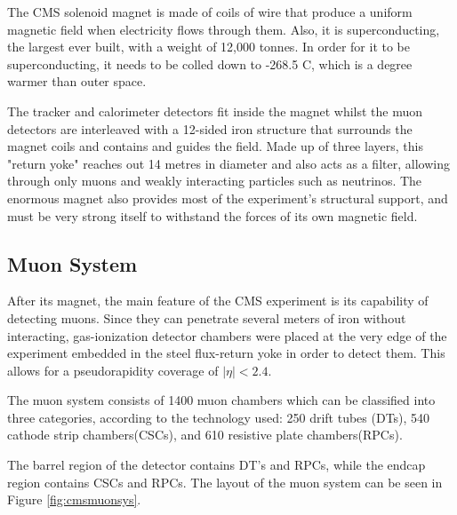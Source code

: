  The CMS solenoid magnet is made of coils of wire that produce a uniform magnetic field when electricity flows through them. Also, it is superconducting, the largest ever built, with a weight of 12,000 tonnes. In order for it to be superconducting, it needs to be colled down to -268.5 C, which is a degree warmer than outer space.

 The tracker and calorimeter detectors fit inside the magnet whilst the muon detectors are interleaved with a 12-sided iron structure that surrounds the magnet coils and contains and guides the field. Made up of three layers, this "return yoke" reaches out 14 metres in diameter and also acts as a filter, allowing through only muons and weakly interacting particles such as neutrinos. The enormous magnet also provides most of the experiment's structural support, and must be very strong itself to withstand the forces of its own magnetic field.


 \subsection{Muon System}
 After its magnet, the main feature of the CMS experiment is its capability of detecting muons. Since they can penetrate several meters of iron without interacting, gas-ionization detector chambers were placed at the very edge of the experiment embedded in the steel flux-return yoke in order to detect them. This allows for a pseudorapidity coverage of $|\eta| < 2.4$.

 The muon system consists of 1400 muon chambers which can be classified into three categories, according to the technology used: 250 drift tubes (DTs), 540 cathode strip chambers(CSCs), and 610 resistive plate chambers(RPCs).

 The barrel region of the detector contains DT's and RPCs, while the endcap region contains CSCs and RPCs. The layout of the muon system can be seen in Figure \ref{fig:cmsmuonsys}. 

